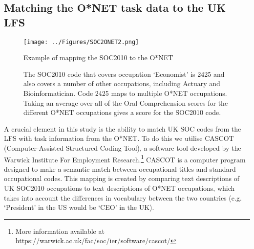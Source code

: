 \documentclass[12pt,authoryear]{elsarticle}
\begin{document}
	
	
	
	
	
	\subsection{Matching the O*NET task data to the UK LFS}
	\label{sec:matchLFSONET}
	
	\begin{figure}[t!]
		\begin{center}
			\texttt{[image: ../Figures/SOC2ONET2.png]}
			\caption{Example of mapping the SOC2010 to the O*NET }
			\caption*{\footnotesize{The SOC2010 code that covers occupation `Economist' is 2425 and also covers a number of other occupations, including Actuary and Bioinformatician. Code 2425 maps to multiple O*NET occupations. Taking an average over all of the Oral Comprehension scores for the different O*NET occupations gives a score for the SOC2010 code. }}
			\label{fig:SOC2ONET}
		\end{center}
	\end{figure}
	
	A crucial element in this study is the ability to match UK SOC codes from the LFS with task information from the O*NET. To do this we utilise CASCOT (Computer-Assisted Structured Coding Tool), a software tool developed by the Warwick Institute For Employment Research.\footnote{More information available at https://warwick.ac.uk/fac/soc/ier/software/cascot/} CASCOT is a computer program designed to make a semantic match between occupational titles and standard occupational codes. This mapping is created by comparing text descriptions of UK SOC2010 occupations to text descriptions of O*NET occupations, which takes into account the differences in vocabulary between the two countries (e.g. `President' in the US would be `CEO' in the UK).
	
\end{document}
